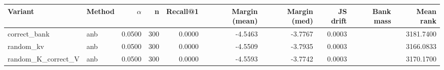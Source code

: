 \begin{tabular}{l l r r r r r r r r}
\toprule
Variant & Method & $\alpha$ & n & Recall@1 & Margin (mean) & Margin (med) & JS drift & Bank mass & Mean rank \\
\midrule
correct\_bank & anb & 0.0500 & 300 & 0.0000 & -4.5463 & -3.7767 & 0.0003 &  & 3181.7400 \\
random\_kv & anb & 0.0500 & 300 & 0.0000 & -4.5509 & -3.7935 & 0.0003 &  & 3166.0833 \\
random\_K\_correct\_V & anb & 0.0500 & 300 & 0.0000 & -4.5593 & -3.7742 & 0.0003 &  & 3170.1700 \\
\bottomrule
\end{tabular}
